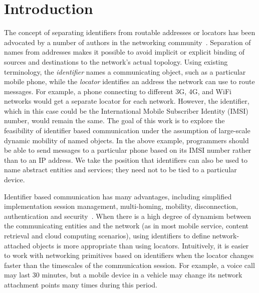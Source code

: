 \section{Introduction}
The concept of separating identifiers from routable addresses or locators has been advocated by a number of authors in the networking community~\cite{saltzer,bennett,moskowitz,milsa}.
Separation of names from addresses makes it possible to avoid implicit or explicit binding of sources and destinations to the network's actual topology. 
Using existing terminology, the {\em identifier} names a
communicating object, such as a particular mobile phone, while the {\em locator}
identifies an address the network can use to route messages. For example,
a phone connecting to different 3G, 4G, and WiFi networks would get a separate
locator for each network. However, the identifier,
which in this case could be the International Mobile Subscriber Identity (IMSI) number, would remain the same. The goal of this work is to explore the
feasibility of identifier based communication under the assumption of large-scale dynamic mobility of named objects. In the above example, programmers should be able to send messages to a particular phone based on its IMSI number rather than to
an IP address. We take the position that identifiers can also be used to name
abstract entities and services; they need not to be tied to a particular
device. %

Identifier based communication has many advantages, including simplified implementation session management, multi-homing, mobility, disconnection, authentication and
security~\cite{saltzer,bennett,moskowitz,milsa}.
When there is a high degree of dynamism between the communicating entities
and the network (as in most mobile service, content retrieval and cloud computing scenarios), using identifiers  to define network-attached objects is more appropriate than using locators.
Intuitively, it is easier to work with networking primitives based on identifiers when the locator changes faster than the
timescales of the communication session. For example, a voice call may last 30 minutes,
but a mobile device in a vehicle may change its network attachment points
many times during this period.

